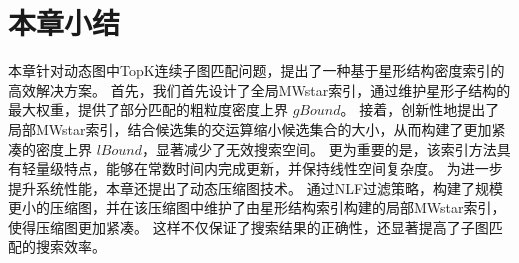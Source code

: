 \section{本章小结}
本章针对动态图中TopK连续子图匹配问题，提出了一种基于星形结构密度索引的高效解决方案。
首先，我们首先设计了全局MWstar索引，通过维护星形子结构的最大权重，提供了部分匹配的粗粒度密度上界 $gBound$。
接着，创新性地提出了局部MWstar索引，结合候选集的交运算缩小候选集合的大小，从而构建了更加紧凑的密度上界 $lBound$，显著减少了无效搜索空间。
更为重要的是，该索引方法具有轻量级特点，能够在常数时间内完成更新，并保持线性空间复杂度。
为进一步提升系统性能，本章还提出了动态压缩图技术。
通过NLF过滤策略，构建了规模更小的压缩图，并在该压缩图中维护了由星形结构索引构建的局部MWstar索引，使得压缩图更加紧凑。
这样不仅保证了搜索结果的正确性，还显著提高了子图匹配的搜索效率。
